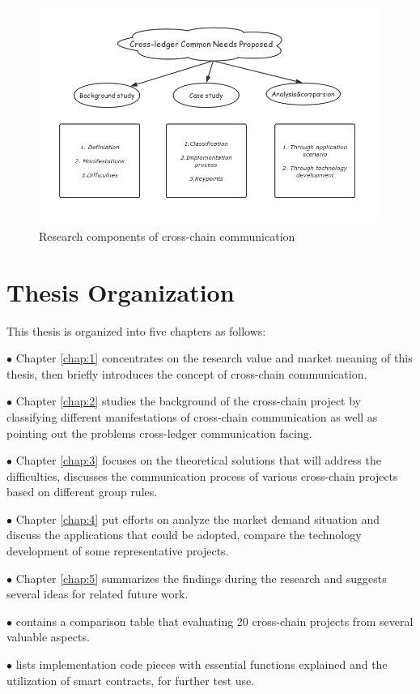     
    \begin{figure}[H]
    \includegraphics[width=1\textwidth]{./figures/contri.png}
    \centering
    \caption{Research components of cross-chain communication}%
    \centering
    \label{fig:contri}
    \end{figure}
    
\section{Thesis Organization}

This thesis is organized into five chapters as follows:

$\bullet $ Chapter \ref{chap:1} concentrates on the research value and market meaning of this thesis, then briefly introduces the concept of cross-chain communication.

$\bullet $ Chapter \ref{chap:2} studies the background of the cross-chain project by classifying different manifestations of cross-chain communication as well as pointing out the problems cross-ledger communication facing.

$\bullet $ Chapter \ref{chap:3} focuses on the theoretical solutions that will address the difficulties, discusses the communication process of various cross-chain projects based on different group rules. 

$\bullet $ Chapter \ref{chap:4} put efforts on analyze the market demand situation and discuss the applications that could be adopted, compare the technology development of some representative projects.

$\bullet $ Chapter \ref{chap:5} summarizes the findings during the research and suggests several ideas for related future work.

$\bullet $  contains a comparison table that evaluating 20 cross-chain projects from several valuable aspects.

$\bullet $  lists implementation code pieces with essential functions explained and the utilization of smart contracts, for further test use.
  
